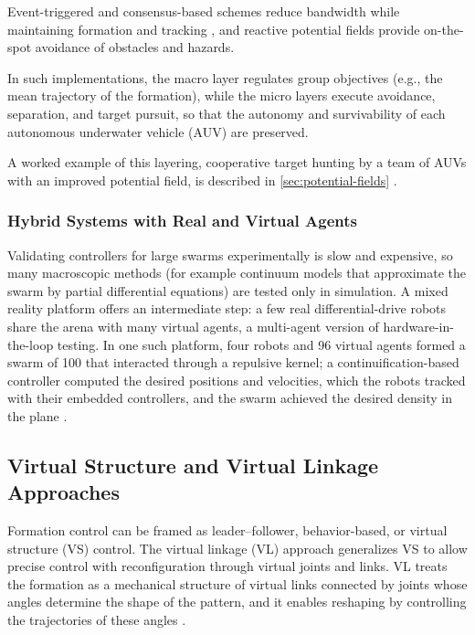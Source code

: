 Event-triggered and consensus-based schemes reduce bandwidth while maintaining
formation and tracking \cite{pan2018signal}, and reactive potential fields
provide on-the-spot avoidance of obstacles and hazards.

In such implementations, the macro layer regulates group objectives (e.g., the
mean trajectory of the formation), while the micro layers execute avoidance,
separation, and target pursuit, so that the autonomy and survivability of each
autonomous underwater vehicle (AUV) are preserved.

A worked example of this layering, cooperative target hunting by a team of
AUVs with an improved potential field, is described in \cref{sec:potential-fields}
\cite{ge2018multi}.

\subsubsection{Hybrid Systems with Real and Virtual Agents}

Validating controllers for large swarms experimentally is slow and expensive, so
many macroscopic methods (for example continuum models that approximate the
swarm by partial differential equations) are tested only in simulation. A mixed
reality platform offers an intermediate step: a few real differential-drive
robots share the arena with many virtual agents, a multi-agent version of
hardware-in-the-loop testing. In one such platform, four robots and 96 virtual
agents formed a swarm of 100 that interacted through a repulsive kernel; a
continuification-based controller computed the desired positions and velocities,
which the robots tracked with their embedded controllers, and the swarm achieved
the desired density in the plane \cite{maffettone2023hybrid}.

\subsection{Virtual Structure and Virtual Linkage Approaches}

Formation control can be framed as leader--follower, behavior-based, or virtual
structure (VS) control. The virtual linkage (VL) approach generalizes VS to allow
precise control with reconfiguration through virtual joints and links. VL treats
the formation as a mechanical structure of virtual links connected by joints
whose angles determine the shape of the pattern, and it enables reshaping by
controlling the trajectories of these angles \cite{liu2018virtual}.

